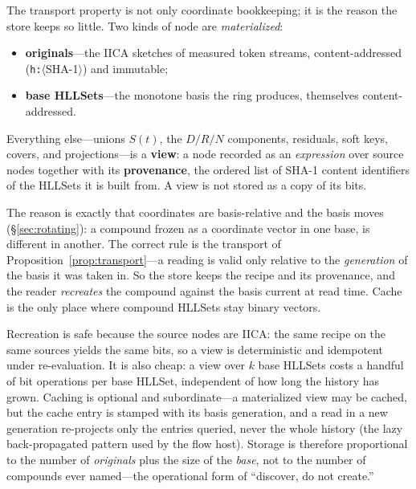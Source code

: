 \documentclass[11pt,a4paper]{article}
\theoremstyle{remark}
\begin{document}
The transport property is not only coordinate bookkeeping; it is the reason the
store keeps so little. Two kinds of node are \emph{materialized}:
\begin{itemize}[leftmargin=*,nosep]
  \item \textbf{originals}---the IICA sketches of measured token streams,
    content-addressed (\texttt{h:}$\langle$SHA-1$\rangle$) and immutable;
  \item \textbf{base HLLSets}---the monotone basis the ring produces,
    themselves content-addressed.
\end{itemize}
Everything else---unions $S(t)$, the $D/R/N$ components, residuals, soft keys,
covers, and projections---is a \textbf{view}: a node recorded as an
\emph{expression} over source nodes together with its \textbf{provenance}, the
ordered list of SHA-1 content identifiers of the HLLSets it is built from. A
view is not stored as a copy of its bits.

The reason is exactly that coordinates are basis-relative and the basis moves
(\S\ref{sec:rotating}): a compound frozen as a coordinate vector in one base, is different in another. The
correct rule is the transport of Proposition~\ref{prop:transport}---a reading is
valid only relative to the \emph{generation} of the basis it was taken in. So
the store keeps the recipe and its provenance, and the reader \emph{recreates}
the compound against the basis current at read time. Cache is the only place where compound HLLSets stay binary vectors.

Recreation is safe because the source nodes are IICA: the same recipe on the
same sources yields the same bits, so a view is deterministic and idempotent
under re-evaluation. It is also cheap: a view over $k$ base HLLSets costs a
handful of bit operations per base HLLSet, independent of how long the history
has grown. Caching is optional and subordinate---a materialized view may be
cached, but the cache entry is stamped with its basis generation, and a read in
a new generation re-projects only the entries queried, never the whole history
(the lazy back-propagated pattern used by the flow host). Storage is therefore
proportional to the number of \emph{originals} plus the size of the
\emph{base}, not to the number of compounds ever named---the operational form of
``discover, do not create.''
\end{document}
